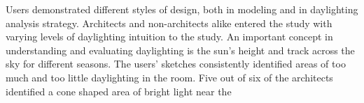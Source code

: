\documentclass{article}
\begin{document}
Users demonstrated different styles of design, both in modeling and in
daylighting analysis strategy.  Architects and non-architects alike
entered the study with varying levels of daylighting intuition to the
study.
%
%
An important concept in understanding and evaluating daylighting is
the sun's height and track across the sky for different seasons.  
%
%
The users' sketches 
consistently identified
areas of too much and too little daylighting in the room.  
Five out of six of the
architects identified a cone shaped area of bright light near the
\end{document}
